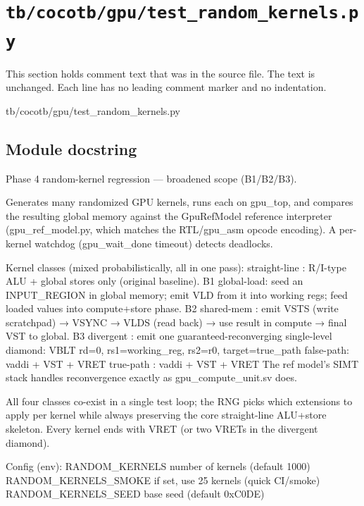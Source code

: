 \section{\texttt{tb/cocotb/gpu/test\_random\_kernels.py}}\label{tm:suite:gpu-test-random-kernels}

This section holds comment text that was in the source file. The text is unchanged. Each line has no leading comment marker and no indentation.

\begin{relocated}{tb/cocotb/gpu/test_random_kernels.py}

\subsection*{Module docstring}

\begin{textblock}
Phase 4 random-kernel regression — broadened scope (B1/B2/B3).

Generates many randomized GPU kernels, runs each on gpu_top, and compares the
resulting global memory against the GpuRefModel reference interpreter
(gpu_ref_model.py, which matches the RTL/gpu_asm opcode encoding). A per-kernel
watchdog (gpu_wait_done timeout) detects deadlocks.

Kernel classes (mixed probabilistically, all in one pass):
straight-line : R/I-type ALU + global stores only (original baseline).
B1 global-load: seed an INPUT_REGION in global memory; emit VLD from it into
working regs; feed loaded values into compute+store phase.
B2 shared-mem : emit VSTS (write scratchpad) → VSYNC → VLDS (read back) →
use result in compute → final VST to global.
B3 divergent  : emit one guaranteed-reconverging single-level diamond:
VBLT rd=0, rs1=working_reg, rs2=r0, target=true_path
false-path: vaddi + VST + VRET
true-path : vaddi + VST + VRET
The ref model's SIMT stack handles reconvergence exactly as
gpu_compute_unit.sv does.

All four classes co-exist in a single test loop; the RNG picks which extensions
to apply per kernel while always preserving the core straight-line ALU+store
skeleton.  Every kernel ends with VRET (or two VRETs in the divergent diamond).

Config (env):
RANDOM_KERNELS        number of kernels (default 1000)
RANDOM_KERNELS_SMOKE  if set, use 25 kernels (quick CI/smoke)
RANDOM_KERNELS_SEED   base seed (default 0xC0DE)
\end{textblock}

\end{relocated}

